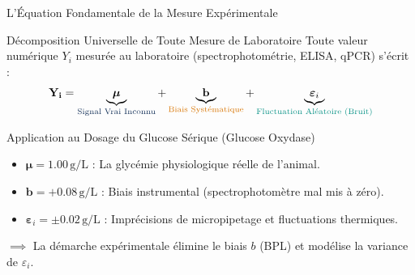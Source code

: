 \documentclass[aspectratio=169,10pt]{beamer}
\begin{document}
\begin{frame}{L'Équation Fondamentale de la Mesure Expérimentale}
  \begin{conceptbox}{Décomposition Universelle de Toute Mesure de Laboratoire}
    Toute valeur numérique $Y_i$ mesurée au laboratoire (spectrophotométrie, ELISA, qPCR) s'écrit :
    \begin{equation*}
      \mathbf{Y_i} = \underbrace{\boldsymbol{\mu}}_{\text{\color{BioNavy}Signal Vrai Inconnu}} + \underbrace{\mathbf{b}}_{\text{\color{BioAmber}Biais Systématique}} + \underbrace{\boldsymbol{\varepsilon}_i}_{\text{\color{BioTeal}Fluctuation Aléatoire (Bruit)}}
    \end{equation*}
  \end{conceptbox}
  \vspace{1mm}
  \begin{biobox}{Application au Dosage du Glucose Sérique (Glucose Oxydase)}
    \begin{itemize}\setlength{\itemsep}{1pt}
      \item $\boldsymbol{\mu} = 1.00\,\text{g/L}$ : La glycémie physiologique réelle de l'animal.
      \item $\mathbf{b} = +0.08\,\text{g/L}$ : Biais instrumental (spectrophotomètre mal mis à zéro).
      \item $\boldsymbol{\varepsilon}_i = \pm 0.02\,\text{g/L}$ : Imprécisions de micropipetage et fluctuations thermiques.
    \end{itemize}
    $\implies$ La démarche expérimentale élimine le biais $b$ (BPL) et modélise la variance de $\varepsilon_i$.
  \end{biobox}
\end{frame}
\end{document}
